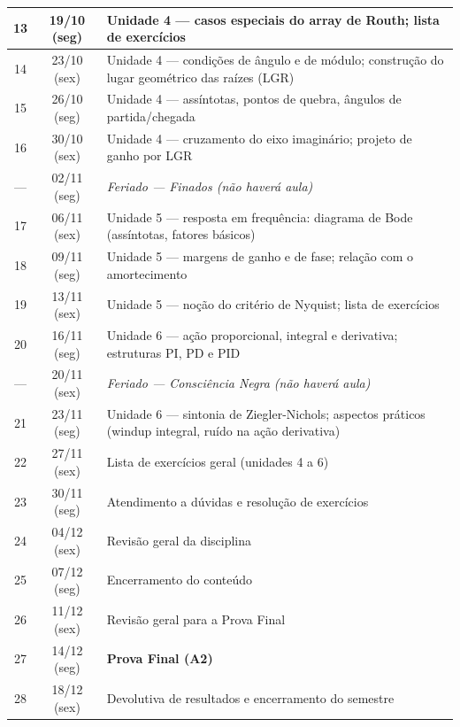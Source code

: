 \documentclass[oneside,a4paper,12pt]{article}
\begin{document}
\begin{longtable}{ |c|c|p{12.5cm}| }
	  \hline
	   13 & 19/10 (seg) & Unidade 4 --- casos especiais do array de Routh; lista de exercícios \\
	  \hline
	   14 & 23/10 (sex) & Unidade 4 --- condições de ângulo e de módulo; construção do lugar geométrico das raízes (LGR) \\
	  \hline
	   15 & 26/10 (seg) & Unidade 4 --- assíntotas, pontos de quebra, ângulos de partida/chegada \\
	  \hline
	   16 & 30/10 (sex) & Unidade 4 --- cruzamento do eixo imaginário; projeto de ganho por LGR \\
	  \hline
	   --- & 02/11 (seg) & \textit{Feriado --- Finados (não haverá aula)} \\
	  \hline
	   17 & 06/11 (sex) & Unidade 5 --- resposta em frequência: diagrama de Bode (assíntotas, fatores básicos) \\
	  \hline
	   18 & 09/11 (seg) & Unidade 5 --- margens de ganho e de fase; relação com o amortecimento \\
	  \hline
	   19 & 13/11 (sex) & Unidade 5 --- noção do critério de Nyquist; lista de exercícios \\
	  \hline
	   20 & 16/11 (seg) & Unidade 6 --- ação proporcional, integral e derivativa; estruturas PI, PD e PID \\
	  \hline
	   --- & 20/11 (sex) & \textit{Feriado --- Consciência Negra (não haverá aula)} \\
	  \hline
	   21 & 23/11 (seg) & Unidade 6 --- sintonia de Ziegler-Nichols; aspectos práticos (windup integral, ruído na ação derivativa) \\
	  \hline
	   22 & 27/11 (sex) & Lista de exercícios geral (unidades 4 a 6) \\
	  \hline
	   23 & 30/11 (seg) & Atendimento a dúvidas e resolução de exercícios \\
	  \hline
	   24 & 04/12 (sex) & Revisão geral da disciplina \\
	  \hline
	   25 & 07/12 (seg) & Encerramento do conteúdo \\
	  \hline
	   26 & 11/12 (sex) & Revisão geral para a Prova Final \\
	  \hline
	   27 & 14/12 (seg) & \textbf{Prova Final (A2)} \\
	  \hline
	   28 & 18/12 (sex) & Devolutiva de resultados e encerramento do semestre \\
      \hline

	\end{longtable}
\vspace{3mm}
\end{document}
